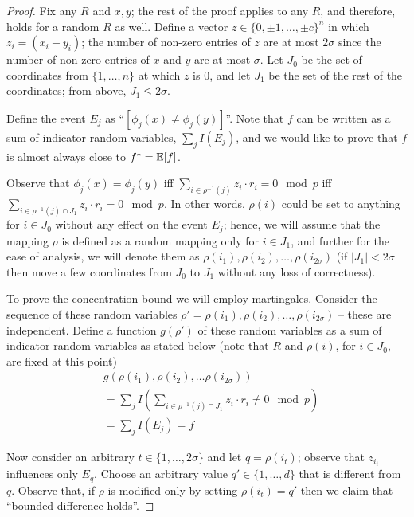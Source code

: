 \begin{proof}
Fix any $R$ and $x,y$; the rest of the proof applies to any $R$, and therefore, holds for a random $R$ as well. Define a vector $z \in \{0,\pm 1,\ldots,\pm c\}^n$ in which $z_i=(x_i - y_i)$; the number of non-zero entries of $z$ are at most $2\sigma$ since the number of non-zero entries of $x$ and $y$ are at most $\sigma$. Let $J_0$ be the set of coordinates from $\{1, \ldots, n\}$ at which $z$ is 0, and let $J_1$ be the set of the rest of the coordinates; from above, $J_1 \le 2\sigma$.%

Define the event $E_j$ as ``$[\phi_j(x)\not=\phi_j(y)]$''. Note that $f$ can be written as a sum of indicator random variables, $\sum_j I(E_j)$, and we would like to prove that $f$ is almost always close to $f^*=\mathbb{E}[f]$.

Observe that $\phi_j(x)=\phi_j(y)$ iff $\sum_{i \in \rho^{-1}(j)} z_i \cdot r_i = 0 \mod{p}$ iff $\sum_{i \in \rho^{-1}(j) \cap J_1} z_i \cdot r_i = 0 \mod{p}$. In other words, $\rho(i)$ could be set to anything for $i \in J_0$ without any effect on the event $E_j$; hence, we will assume that the mapping $\rho$ is defined as a random mapping only for $i \in J_1$, and further for the ease of analysis, we will denote them as $\rho(i_1), \rho(i_2), \ldots, \rho(i_{2\sigma})$ (if $|J_1| < 2\sigma$ then move a few coordinates from $J_0$ to $J_1$ without any loss of correctness).

To prove the concentration bound we will employ martingales. Consider the sequence of these random variables $\rho'=\rho(i_1), \rho(i_2), \ldots, \rho(i_{2\sigma})$ -- these are independent. Define a function $g(\rho')$ of these random variables as a sum of indicator random variables as stated below (note that $R$ and $\rho(i)$, for $i \in J_0$, are fixed at this point)
\begin{align*}
    & g(\rho(i_1), \rho(i_2), \ldots \rho(i_{2\sigma}))\\
    & = \sum_j I\left( \sum_{i \in \rho^{-1}(j) \cap J_1} z_i \cdot r_i \not= 0 \mod{p} \right) \\
    & = \sum_j I(E_j) = f
\end{align*}
 

Now consider an arbitrary $t\in \{1, \ldots, 2\sigma\}$ and let $q=\rho(i_t)$; observe that $z_{i_t}$ influences only $E_q$. Choose an arbitrary value $q' \in \{1, \ldots, d\}$ that is different from $q$. Observe that, if $\rho$ is modified only by setting $\rho(i_t)=q'$ then we claim that ``bounded difference holds''.


\end{proof}
